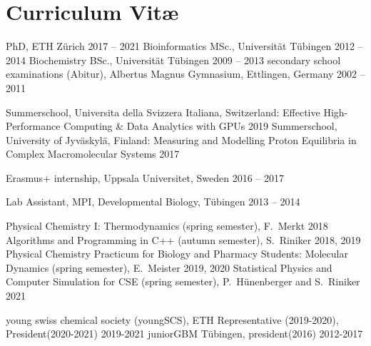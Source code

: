 \chapter{Curriculum Vit\ae}
\vspace{-1cm}
\begin{cvlist}
\end{cvlist}

\begin{cvlist}
\cventry
    {PhD, ETH Z\"{u}rich } %
    {2017 -- 2021} %
\cventry
    {Bioinformatics MSc., Universit\"{a}t T\"{u}bingen} %
    {2012 -- 2014} %
\cventry
    {Biochemistry BSc., Universit\"{a}t T\"{u}bingen} %
    {2009 -- 2013} %
\cventry
    {secondary school examinations (Abitur), Albertus Magnus Gymnasium, Ettlingen, Germany} %
    {2002 -- 2011} 
\end{cvlist}
\vspace{-0.5cm}
\begin{cvlist}
	\cventry
	{Summerschool,  Universita della Svizzera Italiana, Switzerland: Effective High-Performance Computing \& Data Analytics with GPUs} %
	{2019} %
	\cventry
	{Summerschool,  University of Jyväskylä, Finland: Measuring and Modelling Proton Equilibria in Complex Macromolecular Systems} %
	{2017} %
	
	\cventry
	{Erasmus+ internship, Uppsala Universitet, Sweden} %
	{2016 -- 2017} %
	
	\cventry
    {Lab Assistant, MPI, Developmental Biology, T\"{u}bingen} %
    {2013 -- 2014} %
\end{cvlist}
\vspace{-0.75cm}
\begin{cvlist}
	\cventry
	{Physical Chemistry I: Thermodynamics (spring semester), F.\ Merkt} %
	{2018} %
	\cventry
	{Algorithms and Programming in C++ (autumn semester), S.\ Riniker} %
	{2018, 2019} %
	\cventry
	{Physical Chemistry Practicum for Biology and Pharmacy Students: Molecular Dynamics (spring semester), E.\ Meister} %
	{2019, 2020} %
	\cventry
	{Statistical Physics and Computer Simulation for CSE (spring semester), P.\ H\"unenberger and S.\ Riniker} %
	{2021} %
\end{cvlist}
\vspace{-0.75cm}
\begin{cvlist}
	\cventry
	{young swiss chemical society (youngSCS), ETH Representative (2019-2020), President(2020-2021)} %
	{2019-2021} %
	\cventry
	{juniorGBM T\"ubingen, president(2016)} %
	{2012-2017} %
	
\end{cvlist}
